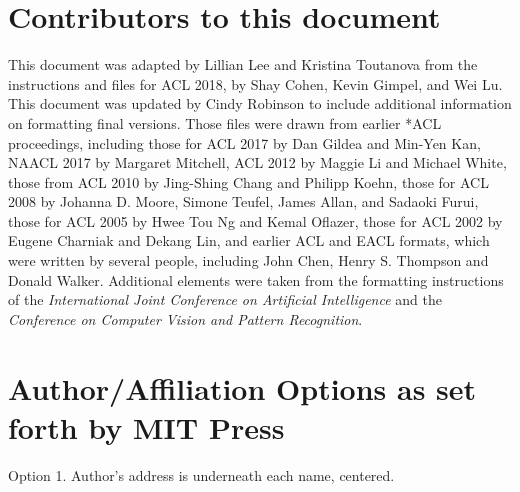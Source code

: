 \documentclass[11pt,a4paper]{article}
\begin{document}
\section{Contributors to this document}
\label{sec:contributors}

This document was adapted by Lillian Lee and Kristina Toutanova
from the instructions and files for ACL 2018, by Shay Cohen, Kevin Gimpel, and
Wei Lu. 
This document was updated by Cindy Robinson to
include additional information on formatting final versions.
Those files were drawn from earlier *ACL proceedings, including those
for ACL 2017 by Dan Gildea and Min-Yen Kan, NAACL 2017 by Margaret Mitchell,
ACL 2012 by Maggie Li and Michael White, those from ACL 2010 by Jing-Shing
Chang and Philipp Koehn, those for ACL 2008 by Johanna D. Moore, Simone
Teufel, James Allan, and Sadaoki Furui, those for ACL 2005 by Hwee Tou Ng and
Kemal Oflazer, those for ACL 2002 by Eugene Charniak and Dekang Lin, and
earlier ACL and EACL formats,  which were written by several people,
including John Chen, Henry S. Thompson and Donald Walker. Additional elements
were taken from the formatting instructions of the {\em International Joint
Conference on Artificial   Intelligence} and the \emph{Conference on Computer
Vision and Pattern Recognition}.




\iftaclpubformat

\onecolumn

\appendix
\section{Author/Affiliation Options as set forth by MIT Press}
\label{sec:authorformatting}

Option 1. Author’s address is underneath each name, centered.
\end{document}

